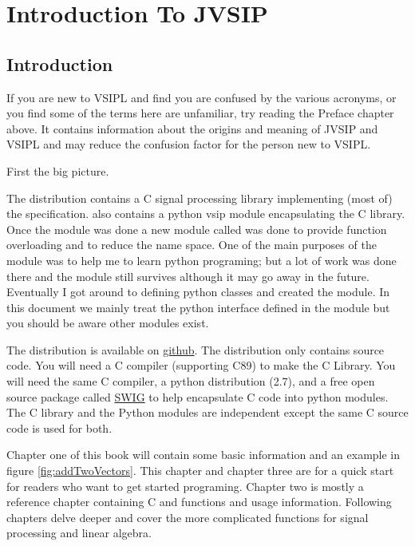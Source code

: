 \chapter{Introduction To JVSIP}
\section*{Introduction}
If you are new to VSIPL and find you are confused by the various acronyms, or you find some of the terms here are unfamiliar, try reading the Preface chapter above. It contains information about the origins and meaning of JVSIP and VSIPL and may reduce the confusion factor for the person new to VSIPL.

First the big picture.

The \jv distribution contains a C signal processing library implementing (most of) the  specification. \jv also contains a python vsip module encapsulating the C library.  Once the {} module was done a new module called {} was done to provide function overloading and to reduce the name space.  One of the main purposes of the {} module was to help me to learn python programing; but a lot of work was done there and the module still survives although it may go away in the future.  Eventually I got around to defining python classes and created the \pyjv module.  In this document we mainly treat the python interface defined in the \pyjv module but you should be aware other modules exist.

The distribution is available on \href{https://github.com/rrjudd/jvsip?}{{github}}. The distribution only contains source code. You will need a C compiler (supporting C89) to make the C Library. You will need the same C compiler, a python distribution (2.7), and a free open source package called \href{http://www.swig.org}{SWIG} to help encapsulate C code into python modules. The C library and the Python modules are independent except the same C source code is used for both.

Chapter one of this book will contain some basic information and an example in figure \ref{fig:addTwoVectors}. This chapter and chapter three are for a quick start for readers who want to get started programing.  Chapter two is mostly a reference chapter containing C and \pyjv functions and usage information.  Following chapters delve deeper and cover the more complicated functions for signal processing and linear algebra.

